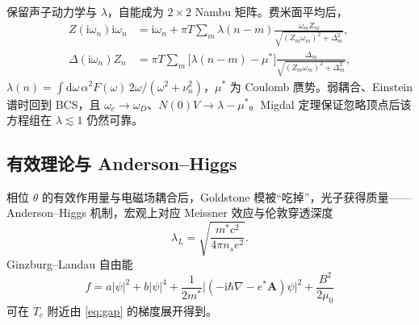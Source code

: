保留声子动力学与 $\lambda$，自能成为 $2\times2$ Nambu 矩阵。费米面平均后，
\begin{equation}
\begin{aligned}
  Z(\mathrm{i}\omega_n)\mathrm{i}\omega_n
  &=\mathrm{i}\omega_n
  +\pi T\sum_m
  \lambda(n-m)
  \frac{\omega_m Z_m}{\sqrt{(Z_m\omega_m)^2+\Delta_m^2}},\\
  \Delta(\mathrm{i}\omega_n)Z_n
  &=\pi T\sum_m
  \bigl[\lambda(n-m)-\mu^*\bigr]
  \frac{\Delta_m}{\sqrt{(Z_m\omega_m)^2+\Delta_m^2}},
\end{aligned}
\label{eq:eliashberg}
\end{equation}
$\lambda(n)=\int\mathrm{d}\omega\,\alpha^2F(\omega)\,2\omega/(\omega^2+\nu_n^2)$，$\mu^*$ 为 Coulomb 赝势。弱耦合、Einstein 谱时回到 BCS，且 $\omega_c\to\omega_D$、$N(0)V\to\lambda-\mu^*$。Migdal 定理保证忽略顶点后该方程组在 $\lambda\lesssim 1$ 仍然可靠。

\subsection{有效理论与 Anderson--Higgs}

相位 $\theta$ 的有效作用量与电磁场耦合后，Goldstone 模被“吃掉”，光子获得质量——Anderson--Higgs 机制，宏观上对应 Meissner 效应与伦敦穿透深度
\begin{equation}
  \lambda_L
  =\sqrt{\frac{m^*c^2}{4\pi n_s e^2}}.
\end{equation}
Ginzburg--Landau 自由能
\begin{equation}
  f
  =a|\psi|^2+b|\psi|^4
  +\frac{1}{2m^*}
  \bigl|(-\mathrm{i}\hbar\nabla-e^*\mathbf{A})\psi\bigr|^2
  +\frac{B^2}{2\mu_0}
\end{equation}
可在 $T_c$ 附近由 \eqref{eq:gap} 的梯度展开得到。
